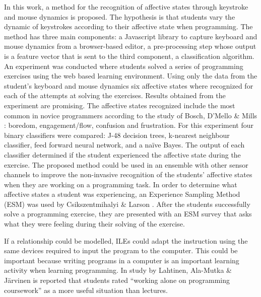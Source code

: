 \documentclass[conference]{IEEEtran}
\begin{document}
In this work, a method for the recognition of affective states through keystroke
and mouse dynamics is proposed. The hypothesis is that students vary the dynamic
of keystrokes according to their affective state when programming. 
 The method
has three main components: a Javascript library to capture keyboard and mouse
dynamics from a browser-based editor, a pre-processing step whose output is a
feature vector that is sent to the third component, a classification algorithm.
An experiment was conducted where students solved a series of programming
exercises using the web based learning environment. Using only the data from the
student’s keyboard and mouse dynamics six affective states where recognized for
each of the attempts at solving the exercises. Results obtained from the
experiment are promising. The affective states recognized include the most
common in novice programmers according to the study of Bosch, D'Mello \& Mills
\cite{bixler2013detecting}: boredom, engagement/flow, confusion and frustration. For this experiment
four binary classifiers were compared: J-48 decision trees, k-nearest neighbour
classifier, feed forward neural network, and a naïve Bayes. The output of each
classifier determined if the student experienced the affective state during the
exercise. The proposed method could be used in an ensemble with other sensor
channels to improve the non-invasive recognition of the students’ affective
states when they are working on a programming task. In order to determine what
affective states a student was experiencing, an Experience Sampling Method (ESM)
was used by Csikszentmihalyi \& Larson \cite{kubey1996experience}. After the students successfully
solve a programming exercise, they are presented with an ESM survey that asks
what they were feeling during their solving of the exercise.

If a relationship could be modelled, ILEs could adapt the instruction using the
same devices required to input the program to the computer. This could be
important because writing programs in a computer is an important learning
activity when learning programming. In study by Lahtinen, Ala-Mutka \& Järvinen
\cite{lahtinen2005study} is reported that students rated ``working alone on programming
coursework'' as a more useful situation than lectures.
\end{document}
